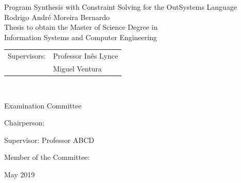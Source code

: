 \begin{center}

\vspace{2.5cm}

\vspace{1.0cm}
{\FontLb Program Synthesis with Constraint Solving for the OutSystems Language} \\
\vspace{2.7cm}
{\FontMb Rodrigo André Moreira Bernardo} \\
\vspace{2.0cm}
{\FontSn Thesis to obtain the Master of Science Degree in} \\
\vspace{0.3cm}
{\FontLb Information Systems and Computer Engineering} \\
\vspace{1.1cm}
{\FontSn %
\begin{tabular}{ll}
	Supervisors: & Professor Inês Lynce \\
	             & Miguel Ventura \\
\end{tabular} } \\

\vspace{1.1cm}

{\FontMb Examination Committee} \\

\vspace{0.3cm}

{\FontSn %
Chairperson: 

Supervisor: Professor ABCD

Member of the Committee: 

}

\vspace{1.5cm}
{\FontMb May 2019} \\
%
\end{center}

\cleardoublepage

